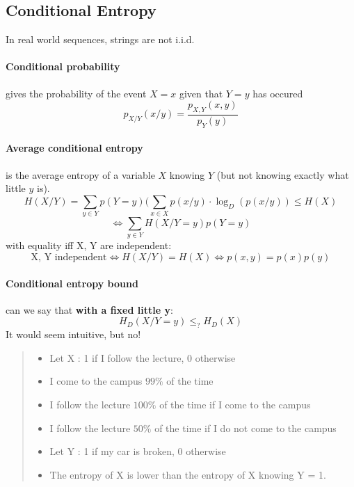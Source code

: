 \documentclass{article}
\begin{document}
\newpage

\subsection{Conditional Entropy}

In real world sequences, strings are not i.i.d.
 
\paragraph{Conditional probability} gives the probability of the event $ X = x $ given that $ Y = y $ has occured
\[ p_{X/Y}(x/y) = \frac{p_{X,Y}(x, y)}{p_Y(y)}\]

\paragraph{Average conditional entropy} is the average entropy of a variable $ X $ knowing $ Y $ (but not knowing exactly what little $ y $ is).
\[ H(X/Y) = \sum_{y \in Y} p(Y = y) (\sum_{x \in X} p(x/y)\cdot{\log_{D}(p(x/y))} \leq H(X) \]
\[ \Leftrightarrow \sum_{y \in Y} H(X/ Y = y)p(Y = y) \]
with equality iff X, Y are independent:
\[ \text{X, Y independent} \Leftrightarrow H(X/Y) = H(X) \Leftrightarrow p(x, y) = p(x)p(y) \]

\paragraph{Conditional entropy bound} can we say that \textbf{with a fixed little y}:
\[ H_D(X/Y = y) \leq_{?} H_D(X) \]
It would seem intuitive, but no!
\begin{quote}
    \begin{itemize}
        \item Let X : 1 if I follow the lecture, 0 otherwise
        \item I come to the campus $ 99\% $ of the time
        \item I follow the lecture $ 100\% $ of the time if I come to the campus
        \item I follow the lecture $ 50\% $ of the time if I do not come to the campus
        \item Let Y : 1 if my car is broken, 0 otherwise
        \item The entropy of X is lower than the entropy of X knowing Y = 1.
    \end{itemize}
\end{quote}
\end{document}
